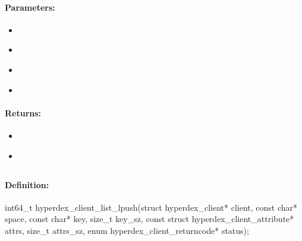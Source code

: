 \paragraph{Parameters:}
\begin{itemize}[noitemsep]
\item {}\\

\item {}\\

\item {}\\

\item {}\\

\end{itemize}

\paragraph{Returns:}
\begin{itemize}[noitemsep]
\item {}\\

\item {}\\

\end{itemize}

\pagebreak
\subsection{}
\label{api:c:list_lpush}


\paragraph{Definition:}
\begin{ccode}
int64_t hyperdex_client_list_lpush(struct hyperdex_client* client,
        const char* space,
        const char* key, size_t key_sz,
        const struct hyperdex_client_attribute* attrs, size_t attrs_sz,
        enum hyperdex_client_returncode* status);
\end{ccode}

